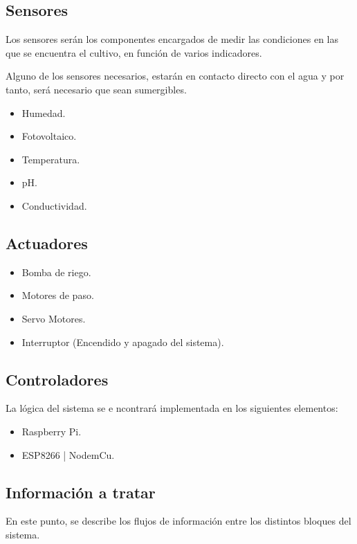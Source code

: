 \documentclass[12pt,a4paper,titlepage,oneside]{report}
\begin{document}
	\subsection*{Sensores}
	Los sensores serán los componentes encargados de medir las condiciones en las que se encuentra el cultivo, en función de varios indicadores.

Alguno de los sensores necesarios, estarán en contacto directo con el agua y por tanto, será necesario que sean sumergibles.\cite{sensores}
		\begin{itemize}
			\item Humedad.
			\item Fotovoltaico.
			\item Temperatura.
			\item pH.
			\item Conductividad.
		\end{itemize}

	\subsection*{Actuadores}

		\begin{itemize}
			\item Bomba de riego.
			\item Motores de paso.
			\item Servo Motores.
			\item Interruptor (Encendido y apagado del sistema).
		\end{itemize}			
	
	\subsection*{Controladores}
	La lógica del sistema se e ncontrará implementada en los siguientes elementos:
		\begin{itemize}
			\item Raspberry Pi.
			\item ESP8266 | NodemCu.
		\end{itemize}			


	
	\subsection*{Información a tratar}
	En este punto, se describe los flujos de información entre los distintos bloques del sistema.
\end{document}
